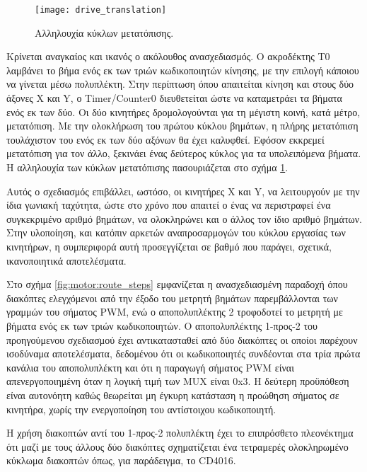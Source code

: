 \begin{figure}
    \caption{Αλληλουχία κύκλων μετατόπισης.\label{fig:motor:translation}}
    \begin{center}
    \texttt{[image: drive\_translation]}
    \end{center}
\end{figure}

Κρίνεται αναγκαίος και ικανός ο ακόλουθος ανασχεδιασμός. Ο ακροδέκτης T0
λαμβάνει το βήμα ενός εκ των τριών κωδικοποιητών κίνησης, με την επιλογή κάποιου
να γίνεται μέσω πολυπλέκτη. Στην περίπτωση όπου απαιτείται κίνηση και στους δύο
άξονες X και Y, ο \textenglish{Timer\slash Counter0} διευθετείται ώστε να
καταμετράει τα βήματα ενός εκ των δύο. Οι δύο κινητήρες δρομολογούνται για τη
μέγιστη κοινή, κατά μέτρο, μετατόπιση. Με την ολοκλήρωση του πρώτου κύκλου
βημάτων, η πλήρης μετατόπιση τουλάχιστον του ενός εκ των δύο αξόνων θα έχει
καλυφθεί. Εφόσον εκκρεμεί μετατόπιση για τον άλλο, ξεκινάει ένας δεύτερος κύκλος
για τα υπολειπόμενα βήματα. Η αλληλουχία των κύκλων μετατόπισης πασουριάζεται
στο σχήμα \ref{fig:motor:translation}.

Αυτός ο σχεδιασμός επιβάλλει, ωστόσο, οι κινητήρες X και Y, να λειτουργούν με
την ίδια γωνιακή ταχύτητα, ώστε στο χρόνο που απαιτεί ο ένας να περιστραφεί
ένα συγκεκριμένο αριθμό βημάτων, να ολοκληρώνει και ο άλλος τον ίδιο αριθμό
βημάτων. Στην υλοποίηση, και κατόπιν αρκετών αναπροσαρμογών του κύκλου εργασίας
των κινητήρων, η συμπεριφορά αυτή προσεγγίζεται σε βαθμό που παράγει, σχετικά,
ικανοποιητικά αποτελέσματα.

Στο σχήμα \ref{fig:motor:route_steps} εμφανίζεται η ανασχεδιασμένη παραδοχή
όπου διακόπτες ελεγχόμενοι από την έξοδο του μετρητή βημάτων παρεμβάλλονται των
γραμμών του σήματος PWM, ενώ ο αποπολυπλέκτης 2 τροφοδοτεί το μετρητή με βήματα
ενός εκ των τριών κωδικοποιητών. Ο αποπολυπλέκτης 1-προς-2 του προηγούμενου
σχεδιασμού έχει αντικατασταθεί από δύο διακόπτες οι οποίοι παρέχουν ισοδύναμα
αποτελέσματα, δεδομένου ότι οι κωδικοποιητές συνδέονται στα τρία πρώτα κανάλια
του αποπολυπλέκτη και ότι η παραγωγή σήματος PWM είναι απενεργοποιημένη όταν η
λογική τιμή των MUX είναι 0x3. Η δεύτερη προϋπόθεση είναι αυτονόητη
καθώς θεωρείται μη έγκυρη κατάσταση η προώθηση σήματος σε κινητήρα, χωρίς την
ενεργοποίηση του αντίστοιχου κωδικοποιητή.

Η χρήση διακοπτών αντί του 1-προς-2 πολυπλέκτη έχει το επιπρόσθετο πλεονέκτημα
ότι μαζί με τους άλλους δύο διακόπτες σχηματίζεται ένα τετραμερές ολοκληρωμένο
κύκλωμα διακοπτών όπως, για παράδειγμα, το CD4016.

